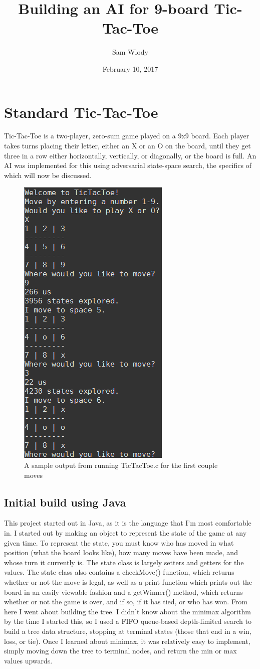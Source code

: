 \documentclass{article}
\title{Building an AI for 9-board Tic-Tac-Toe}
\author{Sam Wlody}
\date{February 10, 2017}
\begin{document}
\maketitle
\section{Standard Tic-Tac-Toe}
Tic-Tac-Toe is a two-player, zero-sum game played on a 9x9 board. Each player takes turns placing their letter, either an X or an O on the board, until they get three in a row either horizontally, vertically, or diagonally, or the board is full. An AI was implemented for this using adversarial state-space search, the specifics of which will now be discussed.
\begin{figure}[H]
	\centering
	\includegraphics[width=0.4\linewidth]{TicTacToeScreen.png}\\
	A sample output from running TicTacToe.c for the first couple moves
\end{figure}
\subsection{Initial build using Java}
This project started out in Java, as it is the language that I'm most comfortable in. I started out by making an object to represent the state of the game at any given time. To represent the state, you must know who has moved in what position (what the board looks like), how many moves have been made, and whose turn it currently is. The state class is largely setters and getters for the values. The state class also contains a checkMove() function, which returns whether or not the move is legal, as well as a print function which prints out the board in an easily viewable fashion and a getWinner() method, which returns whether or not the game is over, and if so, if it has tied, or who has won. From here I went about building the tree. I didn't know about the minimax algorithm by the time I started this, so I used a FIFO queue-based depth-limited search to build a tree data structure, stopping at terminal states (those that end in a win, loss, or tie). Once I learned about minimax, it was relatively easy to implement, simply moving down the tree to terminal nodes, and return the min or max values upwards.
\end{document}
